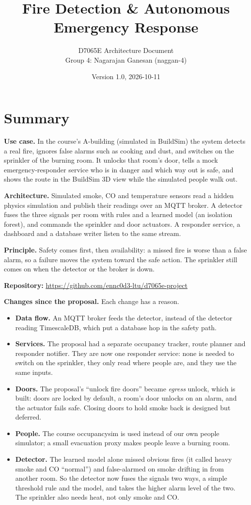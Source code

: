 \documentclass[11pt]{article}
\title{Fire Detection \& Autonomous Emergency Response}
\author{D7065E Architecture Document\\[2pt] Group 4: Nagarajan Ganesan (naggan-4)}
\date{Version 1.0, 2026-10-11}
\providecommand{\tightlist}{\setlength{\itemsep}{0pt}\setlength{\parskip}{0pt}}
\begin{document}
\maketitle
{\small\setlength{\parskip}{0pt}\tableofcontents}
\newpage

\section{Summary}

\textbf{Use case.} In the course's A-building (simulated in BuildSim) the system detects a real fire, ignores false alarms such as cooking and dust, and switches on the sprinkler of the burning room. It unlocks that room's door, tells a mock emergency-responder service who is in danger and which way out is safe, and shows the route in the BuildSim 3D view while the simulated people walk out.

\textbf{Architecture.} Simulated smoke, CO and temperature sensors read a hidden physics simulation and publish their readings over an MQTT broker. A detector fuses the three signals per room with rules and a learned model (an isolation forest), and commands the sprinkler and door actuators. A responder service, a dashboard and a database writer listen to the same stream.

\textbf{Principle.} Safety comes first, then availability: a missed fire is worse than a false alarm, so a failure moves the system toward the safe action. The sprinkler still comes on when the detector or the broker is down.

\textbf{Repository:} \url{https://github.com/ennc0d3-ltu/d7065e-project}

\textbf{Changes since the proposal.} Each change has a reason.
\begin{itemize}\tightlist
\item \textbf{Data flow.} An MQTT broker feeds the detector, instead of the detector reading TimescaleDB, which put a database hop in the safety path.
\item \textbf{Services.} The proposal had a separate occupancy tracker, route planner and responder notifier. They are now one responder service: none is needed to switch on the sprinkler, they only read where people are, and they use the same inputs.
\item \textbf{Doors.} The proposal's ``unlock fire doors'' became \emph{egress} unlock, which is built: doors are locked by default, a room's door unlocks on an alarm, and the actuator fails safe. Closing doors to hold smoke back is designed but deferred.
\item \textbf{People.} The course occupancysim is used instead of our own people simulator; a small evacuation proxy makes people leave a burning room.
\item \textbf{Detector.} The learned model alone missed obvious fires (it called heavy smoke and CO ``normal'') and false-alarmed on smoke drifting in from another room. So the detector now fuses the signals two ways, a simple threshold rule and the model, and takes the higher alarm level of the two. The sprinkler also needs heat, not only smoke and CO.
\end{itemize}
\end{document}
